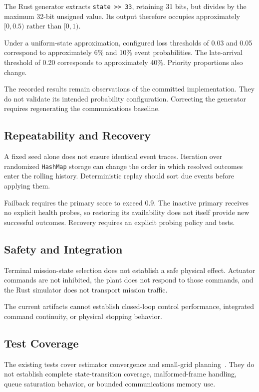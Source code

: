 \documentclass[conference]{IEEEtran}
\begin{document}
The Rust generator extracts \texttt{state >> 33},
retaining 31 bits, but divides by the maximum 32-bit
unsigned value. Its output therefore occupies
approximately $[0,0.5)$ rather than $[0,1)$.

Under a uniform-state approximation, configured loss
thresholds of 0.03 and 0.05 correspond to approximately
6\% and 10\% event probabilities. The late-arrival
threshold of 0.20 corresponds to approximately 40\%.
Priority proportions also change.

The recorded results remain observations of the
committed implementation. They do not validate its
intended probability configuration. Correcting the
generator requires regenerating the communications
baseline.

\subsection{Repeatability and Recovery}

A fixed seed alone does not ensure identical event
traces. Iteration over randomized \texttt{HashMap}
storage can change the order in which resolved outcomes
enter the rolling history. Deterministic replay should
sort due events before applying them.

Failback requires the primary score to exceed 0.9.
The inactive primary receives no explicit health probes,
so restoring its availability does not itself provide
new successful outcomes. Recovery requires an explicit
probing policy and tests.

\subsection{Safety and Integration}

Terminal mission-state selection does not establish
a safe physical effect. Actuator commands are not
inhibited, the plant does not respond to those commands,
and the Rust simulator does not transport mission
traffic.

The current artifacts cannot establish closed-loop
control performance, integrated command continuity,
or physical stopping behavior.

\subsection{Test Coverage}

The existing tests cover estimator convergence and
small-grid planning~\cite{tests}. They do not establish
complete state-transition coverage, malformed-frame
handling, queue saturation behavior, or bounded
communications memory use.
\end{document}
